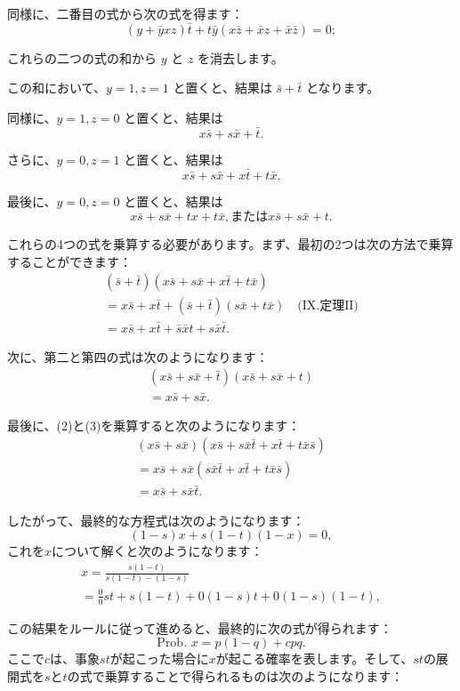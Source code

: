 \documentclass[a4paper,11pt,openany]{ltjsbook}
\begin{document}
同様に、二番目の式から次の式を得ます：
\[(y + \bar{y}xz) \bar{t} + t\bar{y} (x\bar{z} + \bar{x}z + \bar{x}\bar{z}) = 0;\]

これらの二つの式の和から $y$ と $z$ を消去します。

この和において、$y = 1, z = 1$ と置くと、結果は $\bar{s} + \bar{t}$ となります。

同様に、$y = 1, z = 0$ と置くと、結果は
\[ x\bar{s} + s\bar{x} + \bar{t}. \]

さらに、$y = 0, z = 1$ と置くと、結果は
\[ x\bar{s} + s \bar{x} + x\bar{t} + t \bar{x}. \]

最後に、$y = 0, z = 0$ と置くと、結果は
\[ x\bar{s} + s \bar{x} + tx + t\bar{x}, \text {または} x\bar{s} + s\bar{x} + t. \]

これらの4つの式を乗算する必要があります。まず、最初の2つは次の方法で乗算することができます：
\begin{gather*}
(\bar{s} + \bar{t})(x\bar{s} + s\bar{x} + x\bar{t} + t\bar{x}) \\
= x\bar{s} + x\bar{t} + (\bar{s} + \bar{t})(s\bar{x} + t\bar{x}) \quad \text{(IX.定理II)}\\
= x\bar{s} + x\bar{t} + \bar{s}\bar{x}t + s\bar{x}\bar{t}.       \tag{2}
\end{gather*}

次に、第二と第四の式は次のようになります：
\begin{gather*}
(x\bar{s} + s\bar{x} + \bar{t})(x\bar{s} + s\bar{x} + t) \\
= x\bar{s} + s\bar{x}.           \tag{3}
\end{gather*}

最後に、(2)と(3)を乗算すると次のようになります：
\begin{gather*}
(x\bar{s} + s\bar{x})(x\bar{s} + s\bar{x}\bar{t} + x\bar{t} + t\bar{x}\bar{s}) \\
= x\bar{s} + s\bar{x}(s\bar{x}\bar{t} + x\bar{t} + t\bar{x}\bar{s})\\
= x\bar{s} + s\bar{x}\bar{t}.
\end{gather*}

したがって、最終的な方程式は次のようになります：
\[(1-s)x + s(1-t)(1-x) = 0,    \]
これを$x$について解くと次のようになります：
\begin{gather*}
x = \frac{s(1-t)}{s(1-t)-(1-s)} \\
= \frac{0}{0}st + s(1-t) + 0(1-s)t + 0(1-s)(1-t)  ,
\end{gather*}

この結果をルールに従って進めると、最終的に次の式が得られます：
\begin{equation*}
  \text{Prob. }x = p (1-q) + cpq.      \tag{4}
\end{equation*}
ここで$c$は、事象$st$が起こった場合に$x$が起こる確率を表します。そして、$st$の展開式を$s$と$t$の式で乗算することで得られるものは次のようになります：
\end{document}
